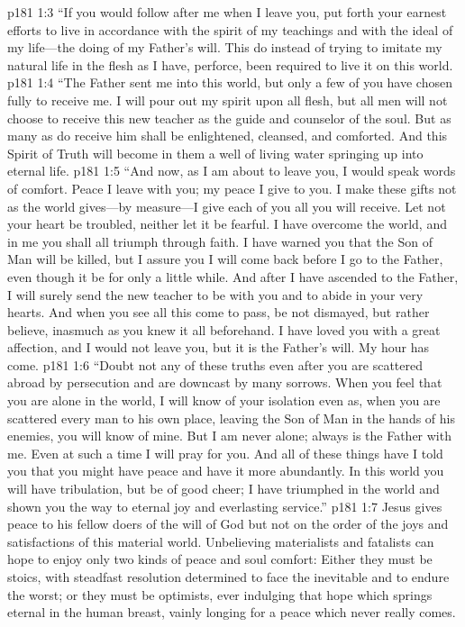 \vs p181 1:3 \textcolor{ubdarkred}{“If you would follow after me when I leave you, put forth your earnest efforts to live in accordance with the spirit of my teachings and with the ideal of my life---the doing of my Father’s will. This do instead of trying to imitate my natural life in the flesh as I have, perforce, been required to live it on this world.}
\vs p181 1:4 \textcolor{ubdarkred}{“The Father sent me into this world, but only a few of you have chosen fully to receive me. I will pour out my spirit upon all flesh, but all men will not choose to receive this new teacher as the guide and counselor of the soul. But as many as do receive him shall be enlightened, cleansed, and comforted. And this Spirit of Truth will become in them a well of living water springing up into eternal life.}
\vs p181 1:5 \textcolor{ubdarkred}{“And now, as I am about to leave you, I would speak words of comfort. Peace I leave with you; my peace I give to you. I make these gifts not as the world gives---by measure---I give each of you all you will receive. Let not your heart be troubled, neither let it be fearful. I have overcome the world, and in me you shall all triumph through faith. I have warned you that the Son of Man will be killed, but I assure you I will come back before I go to the Father, even though it be for only a little while. And after I have ascended to the Father, I will surely send the new teacher to be with you and to abide in your very hearts. And when you see all this come to pass, be not dismayed, but rather believe, inasmuch as you knew it all beforehand. I have loved you with a great affection, and I would not leave you, but it is the Father’s will. My hour has come.}
\vs p181 1:6 \textcolor{ubdarkred}{“Doubt not any of these truths even after you are scattered abroad by persecution and are downcast by many sorrows. When you feel that you are alone in the world, I will know of your isolation even as, when you are scattered every man to his own place, leaving the Son of Man in the hands of his enemies, you will know of mine. But I am never alone; always is the Father with me. Even at such a time I will pray for you. And all of these things have I told you that you might have peace and have it more abundantly. In this world you will have tribulation, but be of good cheer; I have triumphed in the world and shown you the way to eternal joy and everlasting service.”}
\pc \vs p181 1:7 Jesus gives peace to his fellow doers of the will of God but not on the order of the joys and satisfactions of this material world. Unbelieving materialists and fatalists can hope to enjoy only two kinds of peace and soul comfort: Either they must be stoics, with steadfast resolution determined to face the inevitable and to endure the worst; or they must be optimists, ever indulging that hope which springs eternal in the human breast, vainly longing for a peace which never really comes.
